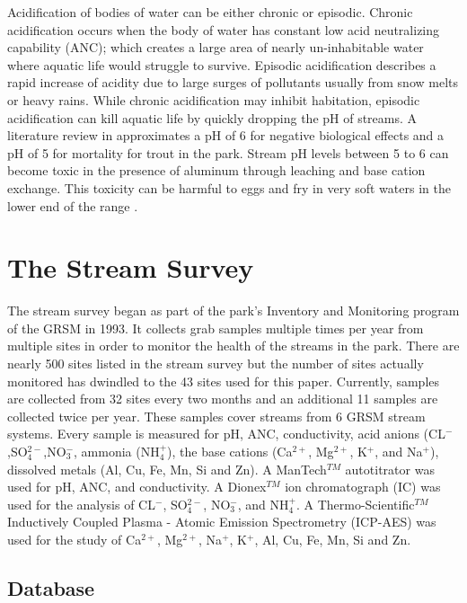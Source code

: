 Acidification of bodies of water can be either chronic or episodic. 
Chronic acidification occurs when the body of water has constant low acid neutralizing capability (ANC); which creates a large area of  nearly un-inhabitable water where aquatic life would struggle to survive. 
Episodic acidification describes a rapid increase of acidity due to large surges of pollutants usually from snow melts or heavy rains.  
While chronic acidification may inhibit habitation, episodic acidification can kill aquatic life by quickly dropping the pH of streams.
A literature review in \citet{neff2009physiological} approximates a pH of 6 for negative biological effects and a pH of 5 for mortality for trout in the park.  
Stream pH levels between 5 to 6 can become toxic in the presence of aluminum through leaching and base cation exchange.
This toxicity can be harmful to eggs and fry in very soft waters in the lower end of the range \citep{robinson2008ph}.  

\section{The Stream Survey} 

The stream survey began as part of the park's Inventory and Monitoring program of the GRSM in 1993.
It collects grab samples multiple times per year from multiple sites in order to monitor the health of the streams in the park.
There are nearly 500 sites listed in the stream survey but the number of sites actually monitored has dwindled to the 43 sites used for this paper.
Currently, samples are collected from 32 sites every two months and an additional 11 samples are collected twice per year.  
These samples cover streams from 6 GRSM stream systems. 
Every sample is  measured for pH, ANC, conductivity, acid anions (CL$^-$,SO$_4^{2-}$,NO$_3^-$, ammonia (NH$_4^+$), the base cations (Ca$^{2+}$, Mg$^{2+}$, K$^+$, and Na$^+$), dissolved metals (Al, Cu, Fe, Mn, Si and Zn).  
A ManTech$^{TM}$ autotitrator was used for pH, ANC, and conductivity.  
A Dionex$^{TM}$ ion chromatograph (IC) was used for the analysis of CL$^-$, SO$_4^{2-}$, NO$_3^-$, and NH$_4^+$.  
A Thermo-Scientific$^{TM}$ Inductively Coupled Plasma - Atomic Emission Spectrometry (ICP-AES) was used for the study of Ca$^{2+}$, Mg$^{2+}$, Na$^+$, K$^+$, Al, Cu, Fe, Mn, Si and Zn.

\subsection{Database}

